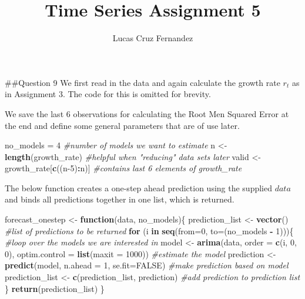 \documentclass[
]{article}
\title{Time Series Assignment 5}
\author{Lucas Cruz Fernandez}
\date{}
\newenvironment{Shaded}{\begin{snugshade}}{\end{snugshade}}
\newcommand{\CommentTok}[1]{\textcolor[rgb]{0.56,0.35,0.01}{\textit{#1}}}
\newcommand{\ControlFlowTok}[1]{\textcolor[rgb]{0.13,0.29,0.53}{\textbf{#1}}}
\newcommand{\DataTypeTok}[1]{\textcolor[rgb]{0.13,0.29,0.53}{#1}}
\newcommand{\DecValTok}[1]{\textcolor[rgb]{0.00,0.00,0.81}{#1}}
\newcommand{\KeywordTok}[1]{\textcolor[rgb]{0.13,0.29,0.53}{\textbf{#1}}}
\newcommand{\NormalTok}[1]{#1}
\newcommand{\OperatorTok}[1]{\textcolor[rgb]{0.81,0.36,0.00}{\textbf{#1}}}
\newcommand{\OtherTok}[1]{\textcolor[rgb]{0.56,0.35,0.01}{#1}}
\newcommand{\StringTok}[1]{\textcolor[rgb]{0.31,0.60,0.02}{#1}}
\begin{document}
\maketitle

\#\#Question 9 We first read in the data and again calculate the growth
rate \(r_t\) as in Assignment 3. The code for this is omitted for
brevity.

We save the last 6 observations for calculating the Root Men Squared
Error at the end and define some general parameters that are of use
later.

\begin{Shaded}
\begin{Highlighting}[]
\NormalTok{no_models =}\StringTok{ }\DecValTok{4} \CommentTok{#number of models we want to estimate}
\NormalTok{n <-}\StringTok{ }\KeywordTok{length}\NormalTok{(growth_rate)  }\CommentTok{#helpful when "reducing" data sets later}
\NormalTok{valid <-}\StringTok{ }\NormalTok{growth_rate[}\KeywordTok{c}\NormalTok{((n}\DecValTok{-5}\NormalTok{)}\OperatorTok{:}\NormalTok{n)] }\CommentTok{#contains last 6 elements of growth_rate}
\end{Highlighting}
\end{Shaded}

The below function creates a one-step ahead prediction using the
supplied \(data\) and binds all predictions together in one list, which
is returned.

\begin{Shaded}
\begin{Highlighting}[]
\NormalTok{forecast_onestep <-}\StringTok{ }\ControlFlowTok{function}\NormalTok{(data, no_models)\{  }
\NormalTok{  prediction_list <-}\StringTok{ }\KeywordTok{vector}\NormalTok{()  }\CommentTok{#list of predictions to be returned}
  \ControlFlowTok{for}\NormalTok{ (i }\ControlFlowTok{in} \KeywordTok{seq}\NormalTok{(}\DataTypeTok{from=}\DecValTok{0}\NormalTok{, }\DataTypeTok{to=}\NormalTok{(no_models }\OperatorTok{-}\StringTok{ }\DecValTok{1}\NormalTok{)))\{     }\CommentTok{#loop over the models we are interested in }
\NormalTok{    model <-}\StringTok{ }\KeywordTok{arima}\NormalTok{(data, }\DataTypeTok{order =} \KeywordTok{c}\NormalTok{(i, }\DecValTok{0}\NormalTok{, }\DecValTok{0}\NormalTok{), }
                 \DataTypeTok{optim.control =} \KeywordTok{list}\NormalTok{(}\DataTypeTok{maxit =} \DecValTok{1000}\NormalTok{))    }\CommentTok{#estimate the model}
\NormalTok{    prediction <-}\StringTok{ }\KeywordTok{predict}\NormalTok{(model, }\DataTypeTok{n.ahead =} \DecValTok{1}\NormalTok{, }\DataTypeTok{se.fit=}\OtherTok{FALSE}\NormalTok{) }\CommentTok{#make prediction based on model}
\NormalTok{    prediction_list <-}\StringTok{ }\KeywordTok{c}\NormalTok{(prediction_list, prediction)   }\CommentTok{#add prediction to prediction list}
\NormalTok{  \}}
  \KeywordTok{return}\NormalTok{(prediction_list)}
\NormalTok{\}}
\end{Highlighting}
\end{Shaded}
\end{document}

